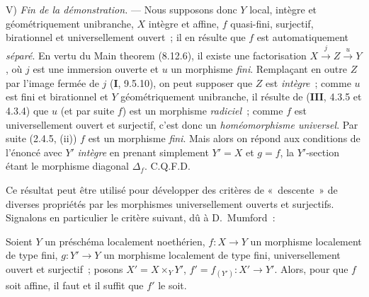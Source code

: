 V) \emph{Fin de la démonstration.} --- Nous supposons donc $Y$ local, intègre et
géométriquement unibranche, $X$ intègre et affine, $f$ quasi-fini, surjectif,
birationnel et universellement ouvert~; il en résulte que $f$ est automatiquement
\emph{séparé}. En vertu du Main theorem (8.12.6), il existe une factorisation
$X\xrightarrow{j}Z\xrightarrow{u}Y$, où $j$ est une immersion ouverte et $u$ un
morphisme \emph{fini}. Remplaçant en outre $Z$ par l'image fermée de $j$
(\textbf{I}, 9.5.10), on peut supposer que $Z$ est \emph{intègre}~; comme $u$ est
fini et birationnel et $Y$ géométriquement unibranche, il résulte de
(\textbf{III}, 4.3.5 et 4.3.4) que $u$ (et par suite $f$) est un morphisme
\emph{radiciel}~; comme $f$ est universellement ouvert et surjectif, c'est donc un
\emph{homéomorphisme universel}. Par suite (2.4.5, (ii)) $f$ est un morphisme
\emph{fini}. Mais alors on répond aux conditions de l'énoncé avec $Y'$ \emph{intègre}
en prenant simplement $Y'=X$ et $g=f$, la $Y'$-section étant le morphisme diagonal
$\Delta_f$. C.Q.F.D.

Ce résultat peut être utilisé pour développer des critères de «~descente~» de
diverses propriétés par les morphismes universellement ouverts et surjectifs.
Signalons en particulier le critère suivant, dû à D.~Mumford~:

\begin{corollary}[14.5.11]
Soient $Y$ un préschéma localement noethérien, $f:X\to Y$ un morphisme localement
de type fini, $g:Y'\to Y$ un morphisme localement de type fini, universellement
ouvert et surjectif~; posons $X'=X\times_Y Y'$, $f'=f_{(Y')}:X'\to Y'$. Alors,
pour que $f$ soit affine, il faut et il suffit que $f'$ le soit.
\end{corollary}

